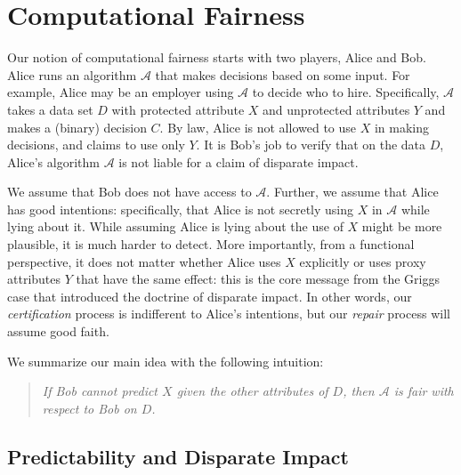 \section{Computational Fairness}
\label{sec:main-idea}

Our notion of computational fairness starts with two players, Alice and Bob. Alice runs an algorithm $\mathcal{A}$ that makes decisions based on some input.  For example, Alice may be an employer using $\mathcal{A}$ to decide who to hire. Specifically, $\mathcal{A}$ takes a data set $D$ with protected attribute $X$ and unprotected attributes $Y$ and makes a (binary) decision $C$. By law, Alice is not allowed to use $X$ in making decisions, and claims to use only $Y$. It is Bob's job to verify that on the data $D$, Alice's algorithm $\mathcal{A}$ is not liable for a claim of disparate impact. 

\vspace*{0.1in} We assume that Bob does not have access to
$\mathcal{A}$. Further, we assume that Alice has good intentions: specifically,
that Alice is not secretly using $X$ in $\mathcal{A}$ while lying about
it. While assuming Alice is lying about the use of $X$ might be more plausible, it is much harder to detect. More importantly, from a functional perspective, it does not matter whether Alice uses $X$ explicitly or uses proxy attributes $Y$ that have the same effect: this is the core message from the Griggs case that introduced the doctrine of disparate impact. In other words, our \emph{certification} process is indifferent to Alice's intentions, but our \emph{repair} process will assume good faith.

We summarize our main idea with the following intuition:
\begin{quote}
\emph{  If Bob cannot predict $X$ given the other attributes of $D$, then $\mathcal{A}$ is fair with respect to Bob on $D$. %
}\end{quote}


\subsection{Predictability and Disparate Impact}

